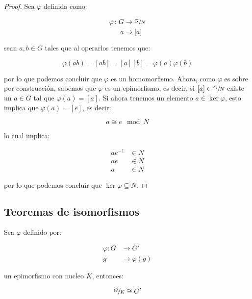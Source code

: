         \begin{proof}
            Sea $\varphi$ definida como:

            \begin{align*}
                \varphi \colon G &\to \sfrac{G}{N} \\
                a &\to [a]
            \end{align*}

            sean $a, b \in G$ tales que al operarlos tenemos que:

            \begin{equation*}
                \varphi(ab) = [ab] = [a][b] = \varphi(a)\varphi(b)
            \end{equation*}

            por lo que podemos concluir que $\varphi$ es un homomorfismo.
            Ahora, como $\varphi$ es sobre por construcción, sabemos que $\varphi$ es un epimorfismo, es decir, si $[a] \in \sfrac{G}{N}$ existe un $a \in G$ tal que $\varphi(a) = [a]$.
            Si ahora tenemos un elemento $a \in \ker{\varphi}$, esto implica que $\varphi(a) = [e]$, es decir:

            \begin{equation*}
                a \cong e \mod N
            \end{equation*}

            lo cual implica:

            \begin{align*}
                a e^{-1} &\in N \\
                a e &\in N \\
                a &\in N
            \end{align*}

            por lo que podemos concluir que $\ker{\varphi} \subseteq N$.
        \end{proof}

    \newpage
    \subsection{Teoremas de isomorfismos}

        \begin{teorema}
            Sea $\varphi$ definido por:

            \begin{align*}
                \varphi \colon G &\to G' \\
                g &\to \varphi(g)
            \end{align*}

            un epimorfismo con nucleo $K$, entonces:

            \begin{equation}
                \sfrac{G}{K} \cong G'
            \end{equation}
        \end{teorema}

